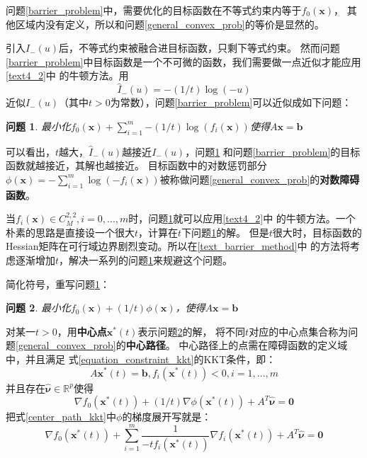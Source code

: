 \documentclass{article}
\newtheorem{problem}{问题}
\begin{document}
问题\ref{barrier_problem}中，需要优化的目标函数在不等式约束内等于$f_0(\bm x)$，
其他区域内没有定义，所以和问题\ref{general_convex_prob}的等价是显然的。

引入$I_-(u)$后，不等式约束被融合进目标函数，只剩下等式约束。
然而问题\ref{barrier_problem}中目标函数是一个不可微的函数，我们需要做一点近似才能应用\ref{text4_2}中
的牛顿方法。用
$$\widehat I_-(u)=-(1/t)\log(-u)$$
近似$I_-(u)$（其中$t>0$为常数），问题\ref{barrier_problem}可以近似成如下问题：
\begin{problem}
    最小化$f_0(\bm x)+\sum\limits_{i=1}^m{-(1/t)\log(f_i(\bm x))}$使得$A\bm x=\bm b$
    \label{barrier_approx_prob}
\end{problem}

可以看出，$t$越大，$\widehat I_-(u)$越接近$I_-(u)$，问题\ref{barrier_approx_prob}
和问题\ref{barrier_problem}的目标函数就越接近，其解也越接近。
目标函数中的对数惩罚部分$\phi(\bm x)=-\sum\limits_{i=1}^m\log (-f_i(\bm x))$被称做问题\ref{general_convex_prob}的\textbf{对数障碍函数}。

当$f_i(\bm x)\in C_M^{2,2},i=0,...,m$时，问题\ref{barrier_approx_prob}就可以应用\ref{text4_2}中
的牛顿方法。一个朴素的思路是直接设一个很大$t$，计算在$t$下问题\ref{barrier_approx_prob}的解。
但是$t$很大时，目标函数的Hessian矩阵在可行域边界剧烈变动。所以在\ref{text_barrier_method}中
的方法将考虑逐渐增加$t$，解决一系列的问题\ref{barrier_approx_prob}来规避这个问题。

简化符号，重写问题\ref{barrier_approx_prob}：
\begin{problem}
    最小化$f_0(\bm x)+(1/t)\phi(\bm x)$，使得$A\bm x=\bm b$
    \label{barrier_approx_prob_simple}
\end{problem}

对某一$t>0$，用\textbf{中心点}$\bm x^*(t)$表示问题\ref{barrier_approx_prob_simple}的解，
将不同$t$对应的中心点集合称为问题\ref{general_convex_prob}的\textbf{中心路径}。
中心路径上的点需在障碍函数的定义域中，并且满足
式\eqref{equation_constraint_kkt}的KKT条件，即：
$$A\bm x^*(t)=\bm b,f_i(\bm x^*(t))<0,i=1,...,m$$
并且存在$\widehat{\bm \nu}\in \mathbb{R}^p$使得
\begin{equation}\nabla f_0(\bm x^*(t))+(1/t)\nabla\phi(\bm x^*(t))+A^T\widehat{\bm \nu}=\bm 0\label{center_path_kkt}\end{equation}
把式\eqref{center_path_kkt}中$\phi$的梯度展开写就是：
\begin{equation}
    \nabla f_0(\bm x^*(t))+\sum\limits_{i=1}^m{\frac{1}{-tf_i(\bm x^*(t))}\nabla f_i(\bm x^*(t))}+A^T\widehat{\bm \nu}=\bm 0\label{center_path_kkt_2}
\end{equation}
\end{document}
